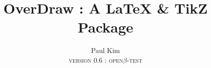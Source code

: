 \documentclass[10pt,a4paper]{article}
\begin{document}
\begin{titlepage}
    \title{OverDraw : A \LaTeX{} \& TikZ Package}
    \author{Paul Kim\\\textsc{version} 0.6 : \textsc{open}$\beta$-\textsc{test}}
    \date{}
\maketitle
\vspace{1in}
\tableofcontents
{}
\end{titlepage}

\addtocounter{page}{1}


\end{document}
